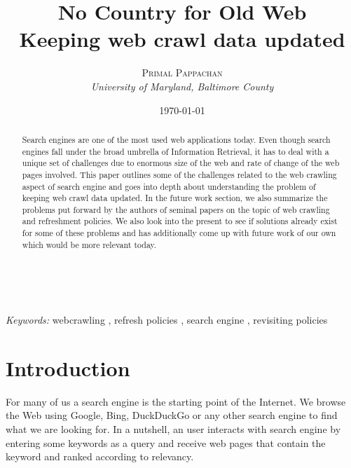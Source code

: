 \documentclass[a4paper, 11pt]{article} %
\title{\textbf{No Country for Old Web}\\ %
Keeping web crawl data updated} %
\author{\textsc{Primal Pappachan} %
\\{\textit{University of Maryland, Baltimore County}}} %
\date{\today} %
\makeatletter
\renewcommand{\maketitle}{ %
\begin{flushright} %
{\LARGE\@title} %

\vspace{50pt} %

{\large\@author} %
\\\@date %

\vspace{40pt} %
\end{flushright}
}
\makeatother
\begin{document}
\maketitle %
\tableofcontents



\begin{abstract}

Search engines are one of the most used web applications today. Even though search engines fall under the broad umbrella of Information Retrieval, it has to deal with a unique set of challenges due to enormous size of the web and rate of change of the web pages involved. This paper outlines some of the challenges related to the web crawling aspect of search engine and goes into depth about understanding the problem of keeping web crawl data updated. In the future work section, we also summarize the problems put forward by the authors of seminal papers on the topic of web crawling and refreshment policies. We also look into the present to see if solutions already exist for some of these problems and has additionally come up with future work of our own which would be more relevant today.   

\end{abstract}

\hspace*{3,6mm}\textit{Keywords:} webcrawling , refresh policies , search engine , revisiting policies %

\vspace{30pt} %


\section{Introduction}

For many of us a search engine is the starting point of the Internet. We browse the Web using Google, Bing, DuckDuckGo or any other search engine to find what we are looking for. In a nutshell, an user interacts with search engine by entering some keywords as a query and receive web pages that contain the keyword and ranked according to relevancy. \\
\end{document}
